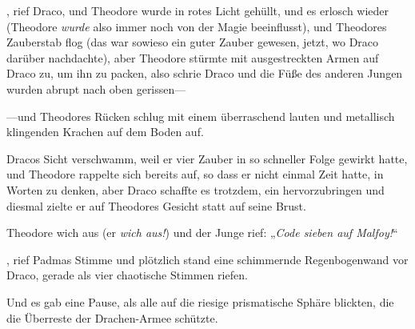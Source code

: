 , rief Draco, und Theodore wurde in rotes Licht gehüllt,  und es erlosch wieder (Theodore \emph{wurde} also immer noch von der Magie beeinflusst),  und Theodores Zauberstab flog (das war sowieso ein guter Zauber gewesen, jetzt, wo Draco darüber nachdachte), aber Theodore stürmte mit ausgestreckten Armen auf Draco zu, um ihn zu packen, also schrie Draco  und die Füße des anderen Jungen wurden abrupt nach oben gerissen—

—und Theodores Rücken schlug mit einem überraschend lauten und metallisch klingenden Krachen auf dem Boden auf.

Dracos Sicht verschwamm, weil er vier Zauber in so schneller Folge gewirkt hatte, und Theodore rappelte sich bereits auf, so dass er nicht einmal Zeit hatte, in Worten zu denken, aber Draco schaffte es trotzdem, ein  hervorzubringen und diesmal zielte er auf Theodores Gesicht statt auf seine Brust.

Theodore wich aus (er \emph{wich aus!}) und der Junge rief: „\emph{Code sieben auf Malfoy!}“

, rief Padmas Stimme und plötzlich stand eine schimmernde Regenbogenwand vor Draco, gerade als vier chaotische Stimmen  riefen.

Und es gab eine Pause, als alle auf die riesige prismatische Sphäre blickten, die die Überreste der Drachen-Armee schützte.

